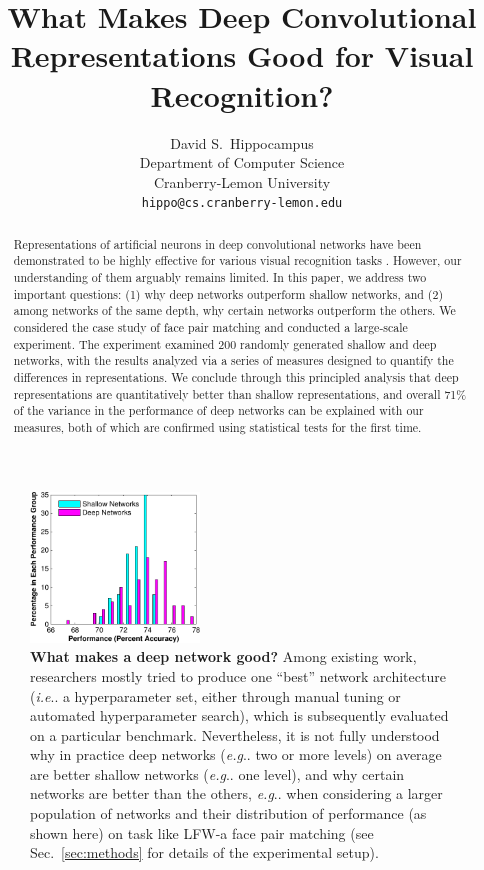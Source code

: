 \documentclass[fleqn]{article} %
\title{What Makes Deep Convolutional Representations Good for Visual Recognition?} %
\author{
David S.~Hippocampus\\
Department of Computer Science\\
Cranberry-Lemon University\\
\texttt{hippo@cs.cranberry-lemon.edu} \\
}
\makeatletter
\DeclareRobustCommand\onedot{\futurelet\@let@token\@onedot}
\def\@onedot{\ifx\@let@token.\else.\null\fi\xspace}
\def\eg{\emph{e.g}\onedot} \def\Eg{\emph{E.g}\onedot}
\def\ie{\emph{i.e}\onedot} \def\Ie{\emph{I.e}\onedot}
\makeatother
\begin{document}
\maketitle

\begin{abstract}
Representations of artificial neurons in deep convolutional networks have been demonstrated to be highly effective for various visual recognition tasks \cite{szegedy2014going, schroff2015facenet, donahue2014decaf}.
However, our understanding of them arguably remains limited.
In this paper, we address two important questions: (1) why deep networks outperform shallow networks, and (2) among networks of the same depth, why certain networks outperform the others.
We considered the case study of face pair matching and conducted a large-scale experiment.
The experiment examined 200 randomly generated shallow and deep networks, with the results analyzed via a series of measures designed to quantify the differences in representations. 
We conclude through this principled analysis that deep representations are quantitatively better than shallow representations, and overall 71\% of the variance in the performance of deep networks can be explained with our measures, both of which are confirmed using statistical tests for the first time.
\end{abstract}

\begin{figure} %
\centering \includegraphics[width=0.40\textwidth]{Figs/perf.pdf} %
\caption{{\bf What makes a deep network good?}
Among existing work, researchers mostly tried to produce one ``best'' network architecture (\ie a hyperparameter set, either through manual tuning or automated hyperparameter search), which is subsequently evaluated on a particular benchmark.
Nevertheless, it is not fully understood why in practice deep networks (\eg two or more levels) on average are better shallow networks (\eg one level), and why certain networks are better than the others, \eg when considering a larger population of networks \cite{cox2011beyond} and their distribution of performance (as shown here) on task like LFW-a face pair matching \cite{wolf2011effective} (see Sec.~\ref{sec:methods} for details of the experimental setup). \vspace{-0.5ex}}
\label{fig:perf}
\end{figure}
\end{document}
